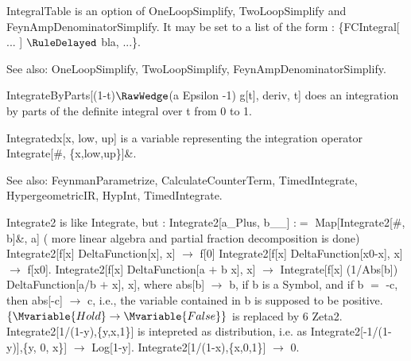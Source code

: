 
IntegralTable is an option of OneLoopSimplify, TwoLoopSimplify and FeynAmpDenominatorSimplify. It may be set to a list of the form :
  \{FCIntegral[ ... ] \(\RuleDelayed \) bla, ...\}.

See also:  OneLoopSimplify, TwoLoopSimplify, FeynAmpDenominatorSimplify.



IntegrateByParts[(1-t)\(\RawWedge\)(a Epsilon -1) g[t], deriv, t] does an integration by parts of the definite integral over t from 0 to
  1.








Integratedx[x, low, up] is a variable representing the integration operator Integrate[\#{}, \{x,low,up\}]\&{}.

See also:  FeynmanParametrize, CalculateCounterTerm, TimedIntegrate, HypergeometricIR, HypInt, TimedIntegrate.



Integrate2 is like Integrate, but : Integrate2[a\_{}Plus, b\_{}\_{}] :\(=\) Map[Integrate2[\#{}, b]\&{}, a] ( more linear algebra and
  partial fraction decomposition is done) Integrate2[f[x] DeltaFunction[x], x] \(\rightarrow \) f[0] Integrate2[f[x] DeltaFunction[x0-x],
  x] \(\rightarrow \) f[x0]. Integrate2[f[x] DeltaFunction[a \(+\) b x], x] \(\rightarrow \) Integrate[f[x] (1/Abs[b]) DeltaFunction[a/b
  \(+\) x], x], where abs[b] \(\rightarrow \) b, if b is a Symbol, and if b \(=\) -c, then abs[-c] \(\rightarrow \) c, i.e., the variable
  contained in b is supposed to be positive. \(\{\Mvariable{Hold}\rightarrow \Mvariable{False}\}\) is replaced by 6 Zeta2. Integrate2[1/(1-y),\{y,x,1\}]
is intepreted as distribution, i.e. as Integrate2[-1/(1-y)],\{y, 0, x\}]
  \(\rightarrow \) Log[1-y]. Integrate2[1/(1-x),\{x,0,1\}] \(\rightarrow \) 0.

